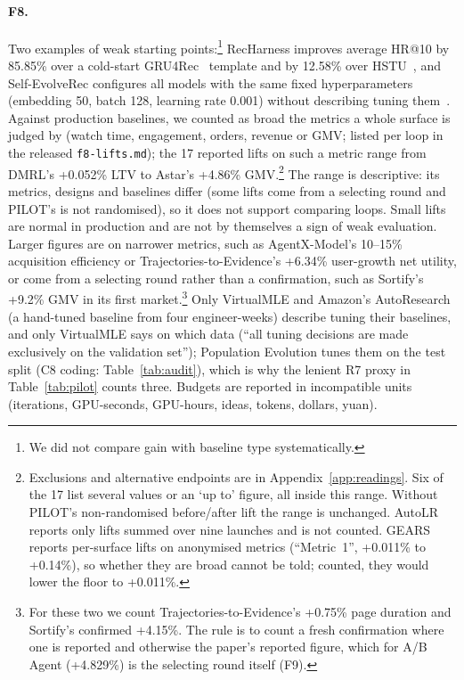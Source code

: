 \documentclass[sigconf,nonacm]{acmart}
\begin{document}
\paragraph{F8.} Two examples of weak starting points:\footnote{We did not compare gain with baseline type systematically.} RecHarness improves average HR@10 by 85.85\% over a cold-start GRU4Rec~\cite{hidasi2016gru4rec} template and by
12.58\% over HSTU~\cite{ling2026recharness}, and Self-EvolveRec configures all models with the same fixed
hyperparameters (embedding 50, batch 128, learning rate 0.001) without describing tuning them~\cite{kim2026selfevolverec}.
Against production baselines, we counted as broad the metrics a whole surface is judged by (watch time,
engagement, orders, revenue or GMV; listed per loop in the released \texttt{f8-lifts.md}); the 17 reported lifts on such a metric range from DMRL's +0.052\% LTV to Astar's +4.86\% GMV.\footnote{Exclusions and alternative endpoints are in Appendix~\ref{app:readings}. Six of the 17 list several
values or an `up to' figure, all inside this range. Without PILOT's non-randomised before/after lift the range is unchanged. AutoLR reports only lifts summed over nine launches and is not counted. GEARS reports per-surface lifts on anonymised metrics (``Metric~1'', +0.011\% to +0.14\%), so whether they are broad cannot be told; counted, they would lower the floor to +0.011\%.} The range is descriptive: its metrics, designs and baselines differ (some lifts come from a selecting round and PILOT's is not randomised), so it does not support comparing loops. Small
lifts are normal in production and are not by themselves a sign of weak evaluation. Larger figures are on narrower
metrics, such as AgentX-Model's 10--15\% acquisition efficiency or Trajectories-to-Evidence's +6.34\% user-growth
net utility, or come from a selecting round rather than a
confirmation, such as Sortify's +9.2\% GMV in its first market.\footnote{For these two we count Trajectories-to-Evidence's +0.75\% page duration and Sortify's confirmed +4.15\%. The rule is to count a fresh confirmation where one is reported and otherwise the paper's reported figure, which for A/B Agent (+4.829\%) is the selecting round itself (F9).} Only VirtualMLE and Amazon's AutoResearch (a hand-tuned baseline from four engineer-weeks) describe tuning their
baselines, and only VirtualMLE says on which data (``all tuning decisions are made exclusively on the validation set''); Population Evolution tunes them on the test split (C8 coding: Table~\ref{tab:audit}), which is why the lenient R7 proxy in Table~\ref{tab:pilot} counts three. Budgets are
reported in incompatible units (iterations, GPU-seconds, GPU-hours, ideas, tokens, dollars, yuan).
\end{document}
